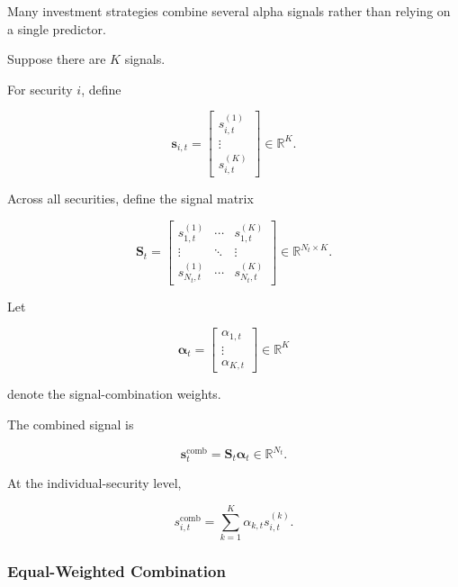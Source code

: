 \documentclass[11pt,a4paper]{article}
\begin{document}
Many investment strategies combine several alpha signals rather than relying on
a single predictor.

Suppose there are $K$ signals.

For security $i$, define

\begin{equation}
\mathbf{s}_{i,t}
=
\begin{bmatrix}
s_{i,t}^{(1)}
\\
\vdots
\\
s_{i,t}^{(K)}
\end{bmatrix}
\in
\mathbb{R}^{K}.
\end{equation}

Across all securities, define the signal matrix

\begin{equation}
\boxed{
\mathbf{S}_t
=
\begin{bmatrix}
s_{1,t}^{(1)} & \cdots & s_{1,t}^{(K)}
\\
\vdots & \ddots & \vdots
\\
s_{N_t,t}^{(1)} & \cdots & s_{N_t,t}^{(K)}
\end{bmatrix}
\in
\mathbb{R}^{N_t\times K}.
}
\end{equation}

Let

\begin{equation}
\boldsymbol{\alpha}_t
=
\begin{bmatrix}
\alpha_{1,t}
\\
\vdots
\\
\alpha_{K,t}
\end{bmatrix}
\in
\mathbb{R}^{K}
\end{equation}

denote the signal-combination weights.

The combined signal is

\begin{equation}
\boxed{
\mathbf{s}_t^{\mathrm{comb}}
=
\mathbf{S}_t
\boldsymbol{\alpha}_t
\in
\mathbb{R}^{N_t}.
}
\end{equation}

At the individual-security level,

\begin{equation}
\boxed{
s_{i,t}^{\mathrm{comb}}
=
\sum_{k=1}^{K}
\alpha_{k,t}
s_{i,t}^{(k)}.
}
\end{equation}


\subsubsection{Equal-Weighted Combination}
\end{document}
